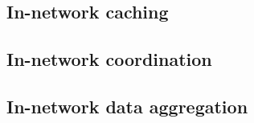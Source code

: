 

\subsection{In-network caching}


\subsection{In-network coordination}


\subsection{In-network data aggregation}
